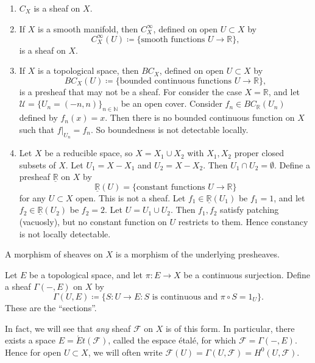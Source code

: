 \documentclass[12pt]{article}
\begin{document}
\begin{example}
	\hfill 
	\begin{enumerate}
		\item $C_X$ is a sheaf on $X$.
		\item If $X$ is a smooth manifold, then $C_X^\infty$, defined on open $U\subset X$ by 
			\begin{equation*}
				C_X^\infty(U)\coloneqq \{\text{smooth functions }U\to\mathbb{R} \},
			\end{equation*}
			is a sheaf on $X$.
		\item If $X$ is a topological space, then $BC_X$, defined on open $U\subset X$ by 
			\begin{equation*}
				BC_X(U)\coloneqq \{\text{bounded continuous functions }U\to\mathbb{R} \},
			\end{equation*}
			is a presheaf that may not be a sheaf. For consider the case $X=\mathbb{R}$, and let $\mathcal{U}=\{U_n=(-n, n)\}_{n\in\mathbb{N}}$ be an open cover. Consider $f_n\in BC_\mathbb{R}(U_n)$ defined by $f_n(x)=x$. Then there is no bounded continuous function on $X$ such that $f|_{U_n}=f_n$. So boundedness is not detectable locally.
		\item Let $X$ be a reducible space, so $X=X_1\cup X_2$ with $X_1,X_2$ proper closed subsets of $X$. Let $U_1=X-X_1$ and $U_2=X-X_2$. Then $U_1\cap U_2=\emptyset$. Define a presheaf $\underline{\mathbb{R}}$ on $X$ by 
			\begin{equation*}
				\underline{\mathbb{R}}(U)=\{\text{constant functions }U\to\mathbb{R} \}
			\end{equation*}
			for any $U\subset X$ open. This is not a sheaf. Let $f_1\in\underline{\mathbb{R}}(U_1)$ be $f_1=1$, and let $f_2\in\underline{\mathbb{R}}(U_2)$ be $f_2=2$. Let $U=U_1\cup U_2$. Then $f_1,f_2$ satisfy patching (vacuosly), but no constant function on $U$ restricts to them. Hence constancy is not locally detectable.
	\end{enumerate}
\end{example}

\begin{definition}
	A morphism of sheaves on $X$ is a morphism of the underlying presheaves.
\end{definition}

\begin{example}
	Let $E$ be a topological space, and let $\pi:E\to X$ be a continuous surjection. Define a sheaf $\Gamma(-, E)$ on $X$ by 
	\begin{equation*}
		\Gamma(U, E) \coloneqq \{S: U\to E : S \text{ is continuous and }\pi\circ S=1_U \}.
	\end{equation*}
	These are the ``sections''. 

	In fact, we will see that \textit{any} sheaf $\mathscr{F}$ on $X$ is of this form. In particular, there exists a space $E=\acute{E}t(\mathscr{F})$, called the espace \'etal\'e, for which $\mathscr{F}=\Gamma(-, E)$. Hence for open $U\subset X$, we will often write $\mathscr{F}(U)=\Gamma(U,\mathscr{F})=H^0(U,\mathscr{F})$.
\end{example}
\end{document}
